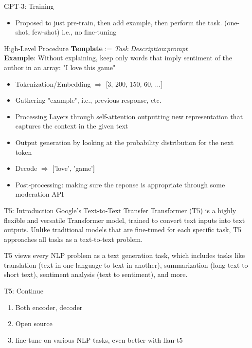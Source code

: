 \documentclass{beamer}
\begin{document}
\begin{frame}{GPT-3: Training}
\begin{itemize}
    \item Proposed to just pre-train, then add example, then perform the task. (one-shot, few-shot) i.e., no fine-tuning
\end{itemize}
    
\end{frame}

\begin{frame}{High-Level Procedure}
\textbf{Template} := \textit{Task Description}:\textit{prompt} \\
\textbf{Example}: Without explaining, keep only words that imply sentiment of the author in an array: "I love this game"
\begin{itemize}
    \item  Tokenization/Embedding $\Rightarrow$ [3, 200, 150, 60, ...] 
    \item Gathering "example", i.e., previous response, etc.
    \item Processing Layers through self-attention outputting new representation that captures the context in the given text
    \item Output generation by looking at the probability distribution for the next token
    \item  Decode  $\Rightarrow$ ['love', 'game']
    \item Post-processing: making sure the reponse is appropriate through some moderation API
\end{itemize}
    
\end{frame}

\begin{frame}{T5: Introduction}
    Google's Text-to-Text Transfer Transformer (T5) is a highly flexible and versatile Transformer model, trained to convert text inputs into text outputs. Unlike traditional models that are fine-tuned for each specific task, T5 approaches all tasks as a text-to-text problem.

T5 views every NLP problem as a text generation task, which includes tasks like translation (text in one language to text in another), summarization (long text to short text), sentiment analysis (text to sentiment), and more.

\end{frame}

\begin{frame}{T5: Continue}
\begin{enumerate}
    \item Both encoder, decoder
    \item Open source
    \item fine-tune on various NLP tasks, even better with flan-t5
\end{enumerate}
\end{frame}
\end{document}
